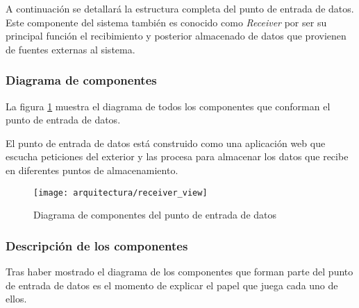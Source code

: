 A continuación se detallará la estructura completa del punto de entrada de datos.  Este componente del sistema también es conocido como \textit{Receiver} por ser su principal función el recibimiento y posterior almacenado de datos que provienen de fuentes externas al sistema.


\subsubsection{Diagrama de componentes}
La figura \ref{fig:diagrama_componentes_receiver} muestra el diagrama de todos los componentes que conforman el punto de entrada de datos.

El punto de entrada de datos está construido como una aplicación web que escucha peticiones del exterior y las procesa para almacenar los datos que recibe en diferentes puntos de almacenamiento.
\begin{landscape}
	\begin{figure}[ht]
		\centering
		\texttt{[image: arquitectura/receiver\_view]}
		\caption{Diagrama de componentes del punto de entrada de datos}
		\label{fig:diagrama_componentes_receiver}
	\end{figure}
\end{landscape}


\subsubsection{Descripción de los componentes}
Tras haber mostrado el diagrama de los componentes que forman parte del punto de entrada de datos es el momento de explicar el papel que juega cada uno de ellos.

